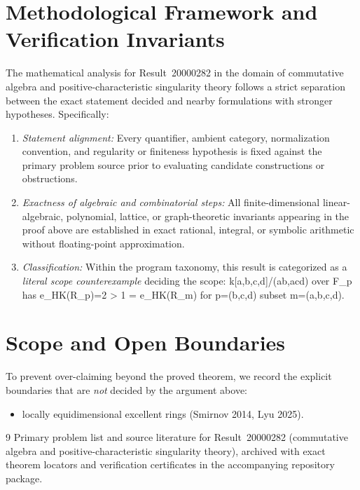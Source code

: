 \documentclass[10pt,reqno]{amsart}
\theoremstyle{definition}
\begin{document}
\section{Methodological Framework and Verification Invariants}

The mathematical analysis for Result~20000282 in the domain of commutative algebra and positive-characteristic singularity theory follows a strict separation between the exact statement decided and nearby formulations with stronger hypotheses. Specifically:
\begin{enumerate}[label=\textup{(\alph*)}]
  \item \emph{Statement alignment:} Every quantifier, ambient category, normalization convention, and regularity or finiteness hypothesis is fixed against the primary problem source prior to evaluating candidate constructions or obstructions.
  \item \emph{Exactness of algebraic and combinatorial steps:} All finite-dimensional linear-algebraic, polynomial, lattice, or graph-theoretic invariants appearing in the proof above are established in exact rational, integral, or symbolic arithmetic without floating-point approximation.
  \item \emph{Classification:} Within the program taxonomy, this result is categorized as a \emph{literal scope counterexample} deciding the scope: k[a,b,c,d]/(ab,acd) over F\_p has e\_HK(R\_p)=2 > 1 = e\_HK(R\_m) for p=(b,c,d) subset m=(a,b,c,d).
\end{enumerate}

\section{Scope and Open Boundaries}

To prevent over-claiming beyond the proved theorem, we record the explicit boundaries that are \emph{not} decided by the argument above:
\begin{itemize}
  \item locally equidimensional excellent rings (Smirnov 2014, Lyu 2025).
\end{itemize}

\begin{thebibliography}{9}
Primary problem list and source literature for Result~20000282 (commutative algebra and positive-characteristic singularity theory), archived with exact theorem locators and verification certificates in the accompanying repository package.
\end{thebibliography}
\end{document}
